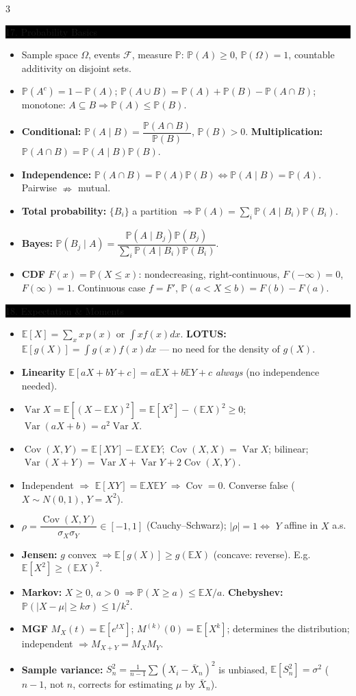 \documentclass[8pt,letterpaper]{article}
\makeatletter
\newcommand{\sect}[1]{%
  \vspace{2.2pt}%
  \noindent\colorbox{black}{\parbox{\dimexpr\linewidth-2\fboxsep}{%
    \color{white}\bfseries\scshape\fontsize{6.4}{7.4}\selectfont
    \hyphenpenalty=10000\exhyphenpenalty=10000\raggedright #1}}%
  \vspace{1.4pt}\par\nopagebreak\@afterheading}
\newenvironment{tl}
  {\begin{itemize}[leftmargin=6pt,itemsep=0.3pt,topsep=1pt,parsep=0pt,
                   partopsep=0pt,label=\textcolor{gray}{\tiny$\bullet$}]}
  {\end{itemize}}
\newcommand{\E}{\mathbb{E}}
\newcommand{\PP}{\mathbb{P}}
\newcommand{\Var}{\operatorname{Var}}
\newcommand{\Cov}{\operatorname{Cov}}
\makeatother
\begin{document}
\begin{multicols}{3}
\sect{17. Probability Basics}
\begin{tl}
\item Sample space $\Omega$, events $\mathcal F$, measure $\PP$: $\PP(A)\ge0$, $\PP(\Omega)=1$, countable additivity on disjoint sets.
\item $\PP(A^c)=1-\PP(A)$; $\PP(A\cup B)=\PP(A)+\PP(B)-\PP(A\cap B)$; monotone: $A\subseteq B\Rightarrow\PP(A)\le\PP(B)$.
\item \textbf{Conditional:} $\PP(A\mid B)=\dfrac{\PP(A\cap B)}{\PP(B)}$, $\PP(B)>0$. \textbf{Multiplication:} $\PP(A\cap B)=\PP(A\mid B)\PP(B)$.
\item \textbf{Independence:} $\PP(A\cap B)=\PP(A)\PP(B)\iff\PP(A\mid B)=\PP(A)$. Pairwise $\nRightarrow$ mutual.
\item \textbf{Total probability:} $\{B_i\}$ a partition $\Rightarrow\PP(A)=\sum_i\PP(A\mid B_i)\PP(B_i)$.
\item \textbf{Bayes:} $\PP(B_j\mid A)=\dfrac{\PP(A\mid B_j)\PP(B_j)}{\sum_i\PP(A\mid B_i)\PP(B_i)}$.
\item \textbf{CDF} $F(x)=\PP(X\le x)$: nondecreasing, right-continuous, $F(-\infty)=0$, $F(\infty)=1$. Continuous case $f=F'$, $\PP(a<X\le b)=F(b)-F(a)$.
\end{tl}

\sect{18. Expectation \& Moments}
\begin{tl}
\item $\E[X]=\sum_x x\,p(x)$ or $\int x f(x)dx$. \textbf{LOTUS:} $\E[g(X)]=\int g(x)f(x)dx$ --- no need for the density of $g(X)$.
\item \textbf{Linearity} $\E[aX+bY+c]=a\E X+b\E Y+c$ \emph{always} (no independence needed).
\item $\Var X=\E[(X-\E X)^2]=\E[X^2]-(\E X)^2\ge0$; $\Var(aX+b)=a^2\Var X$.
\item $\Cov(X,Y)=\E[XY]-\E X\,\E Y$; $\Cov(X,X)=\Var X$; bilinear; $\Var(X+Y)=\Var X+\Var Y+2\Cov(X,Y)$.
\item Independent $\Rightarrow$ $\E[XY]=\E X\E Y$ $\Rightarrow\Cov=0$. \colorbox{black!12}{Converse false} ($X\sim N(0,1)$, $Y=X^2$).
\item $\rho=\dfrac{\Cov(X,Y)}{\sigma_X\sigma_Y}\in[-1,1]$ (Cauchy--Schwarz); $|\rho|=1\iff$ $Y$ affine in $X$ a.s.
\item \textbf{Jensen:} $g$ convex $\Rightarrow\E[g(X)]\ge g(\E X)$ (concave: reverse). E.g.\ $\E[X^2]\ge(\E X)^2$.
\item \textbf{Markov:} $X\ge0$, $a>0$ $\Rightarrow\PP(X\ge a)\le\E X/a$. \textbf{Chebyshev:} $\PP(|X-\mu|\ge k\sigma)\le1/k^2$.
\item \textbf{MGF} $M_X(t)=\E[e^{tX}]$; $M^{(k)}(0)=\E[X^k]$; determines the distribution; independent $\Rightarrow M_{X+Y}=M_XM_Y$.
\item \textbf{Sample variance:} $S_n^2=\frac1{n-1}\sum(X_i-\bar X_n)^2$ is unbiased, $\E[S_n^2]=\sigma^2$ ($n-1$, not $n$, corrects for estimating $\mu$ by $\bar X_n$).
\end{tl}


\end{multicols}
\end{document}
